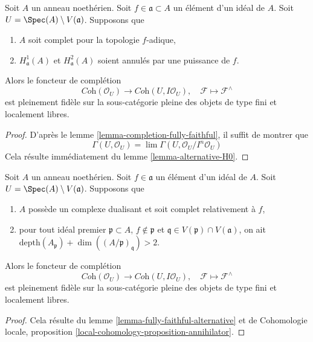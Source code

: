 \begin{lemma}
\label{lemma-fully-faithful-alternative}
Soit $A$ un anneau noethérien. Soit $f \in \mathfrak a \subset A$
un élément d'un idéal de $A$. Soit $U = \Spec(A) \setminus V(\mathfrak a)$.
Supposons que
\begin{enumerate}
\item $A$ soit complet pour la topologie $f$-adique,
\item $H^1_\mathfrak a(A)$ et $H^2_\mathfrak a(A)$ soient
annulés par une puissance de $f$.
\end{enumerate}
Alors le foncteur de complétion
$$
\textit{Coh}(\mathcal{O}_U)
\longrightarrow
\textit{Coh}(U, I\mathcal{O}_U),
\quad
\mathcal{F} \longmapsto \mathcal{F}^\wedge
$$
est pleinement fidèle sur la sous-catégorie pleine des
objets de type fini et localement libres.
\end{lemma}

\begin{proof}
D'après le lemme \ref{lemma-completion-fully-faithful},
il suffit de montrer que
$$
\Gamma(U, \mathcal{O}_U) =
\lim \Gamma(U, \mathcal{O}_U/I^n\mathcal{O}_U)
$$
Cela résulte immédiatement du
lemme \ref{lemma-alternative-H0}.
\end{proof}

\begin{lemma}
\label{lemma-fully-faithful-simple-two}
Soit $A$ un anneau noethérien. Soit $f \in \mathfrak a$ un élément d'un
idéal de $A$. Soit $U = \Spec(A) \setminus V(\mathfrak a)$. Supposons que
\begin{enumerate}
\item $A$ possède un complexe dualisant et soit complet relativement à $f$,
\item pour tout idéal premier $\mathfrak p \subset A$, $f \not \in \mathfrak p$
et $\mathfrak q \in V(\mathfrak p) \cap V(\mathfrak a)$, on ait
$\text{depth}(A_\mathfrak p) + \dim((A/\mathfrak p)_\mathfrak q) > 2$.
\end{enumerate}
Alors le foncteur de complétion
$$
\textit{Coh}(\mathcal{O}_U)
\longrightarrow
\textit{Coh}(U, I\mathcal{O}_U),
\quad
\mathcal{F} \longmapsto \mathcal{F}^\wedge
$$
est pleinement fidèle sur la sous-catégorie pleine des objets de type fini et localement libres.
\end{lemma}

\begin{proof}
Cela résulte du lemme \ref{lemma-fully-faithful-alternative} et de
Cohomologie locale, proposition \ref{local-cohomology-proposition-annihilator}.
\end{proof}

